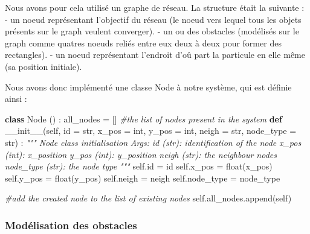 \documentclass[
]{article}
\newenvironment{Shaded}{}{}
\newcommand{\BuiltInTok}[1]{#1}
\newcommand{\CommentTok}[1]{\textcolor[rgb]{0.38,0.63,0.69}{\textit{#1}}}
\newcommand{\FunctionTok}[1]{\textcolor[rgb]{0.02,0.16,0.49}{#1}}
\newcommand{\KeywordTok}[1]{\textcolor[rgb]{0.00,0.44,0.13}{\textbf{#1}}}
\newcommand{\NormalTok}[1]{#1}
\newcommand{\OperatorTok}[1]{\textcolor[rgb]{0.40,0.40,0.40}{#1}}
\newcommand{\VariableTok}[1]{\textcolor[rgb]{0.10,0.09,0.49}{#1}}
\begin{document}
Nous avons pour cela utilisé un graphe de réseau. La structure était la
suivante : - un noeud représentant l'objectif du réseau (le noeud vers
lequel tous les objets présents sur le graph veulent converger). - un ou
des obstacles (modélisés sur le graph comme quatres noeuds reliés entre
eux deux à deux pour former des rectangles). - un noeud représentant
l'endroit d'oû part la particule en elle même (sa position initiale).

Nous avons donc implémenté une classe Node à notre système, qui est
définie ainsi :

\begin{Shaded}
\begin{Highlighting}[]
\KeywordTok{class}\NormalTok{ Node () :}
\NormalTok{  all\_nodes }\OperatorTok{=}\NormalTok{ [] }\CommentTok{\#the list of nodes present in the system}
  \KeywordTok{def} \FunctionTok{\_\_init\_\_}\NormalTok{(}\VariableTok{self}\NormalTok{, }\BuiltInTok{id} \OperatorTok{=} \BuiltInTok{str}\NormalTok{, x\_pos }\OperatorTok{=} \BuiltInTok{int}\NormalTok{, y\_pos }\OperatorTok{=} \BuiltInTok{int}\NormalTok{, neigh }\OperatorTok{=} \BuiltInTok{str}\NormalTok{, node\_type }\OperatorTok{=} \BuiltInTok{str}\NormalTok{) : }
    \CommentTok{"""}
\CommentTok{    Node class initialisation}
\CommentTok{    Args:}
\CommentTok{        id (str): identification of the node}
\CommentTok{        x\_pos (int): x\_position}
\CommentTok{        y\_pos (int): y\_position}
\CommentTok{        neigh (str): the neighbour nodes}
\CommentTok{        node\_type (str): the node type}
\CommentTok{    """}
    \VariableTok{self}\NormalTok{.}\BuiltInTok{id} \OperatorTok{=} \BuiltInTok{id}
    \VariableTok{self}\NormalTok{.x\_pos }\OperatorTok{=} \BuiltInTok{float}\NormalTok{(x\_pos)}
    \VariableTok{self}\NormalTok{.y\_pos }\OperatorTok{=} \BuiltInTok{float}\NormalTok{(y\_pos)}
    \VariableTok{self}\NormalTok{.neigh }\OperatorTok{=}\NormalTok{ neigh}
    \VariableTok{self}\NormalTok{.node\_type }\OperatorTok{=}\NormalTok{ node\_type}
    
    \CommentTok{\#add the created node to the list of existing nodes}
    \VariableTok{self}\NormalTok{.all\_nodes.append(}\VariableTok{self}\NormalTok{)}
\end{Highlighting}
\end{Shaded}

\hypertarget{moduxe9lisation-des-obstacles}{%
\subsubsection{Modélisation des
obstacles}\label{moduxe9lisation-des-obstacles}}
\end{document}
